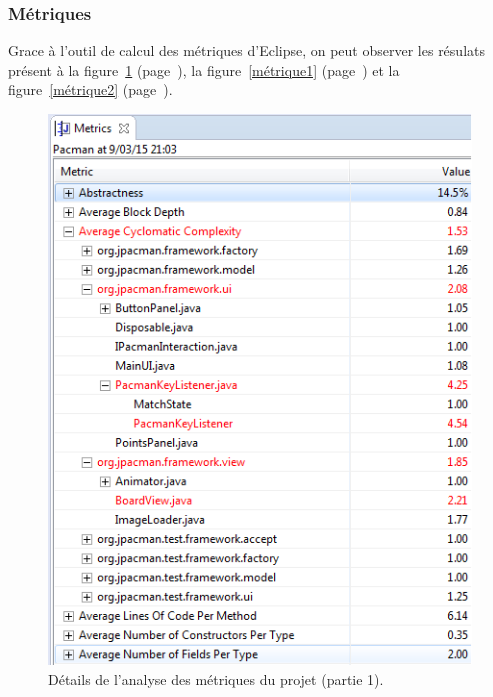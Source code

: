 \documentclass[12pt,a4paper,final]{article}
\newcommand{\labelfigure}[1]{figure~\ref{#1} (page~\pageref{#1})}
\begin{document}
\subsubsection{Métriques}
Grace à l'outil de calcul des métriques d'Eclipse, on peut observer les résulats présent à la \labelfigure{métrique0}, la \labelfigure{métrique1} et la \labelfigure{métrique2}. 
\begin{figure}[!h]
	\centering
	\includegraphics[height=\textheight]{Metrique0.png}
	\caption{\label{métrique0}Détails de l'analyse des métriques du projet (partie 1).}
\end{figure}
\end{document}
